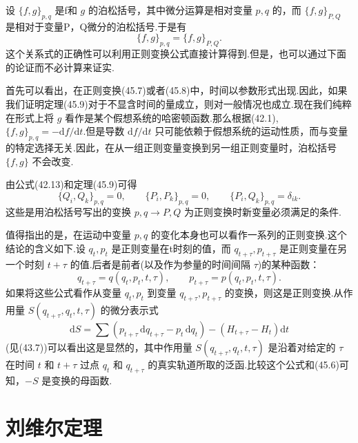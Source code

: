 设 $\{f,g\}_{p,q}$ 是f和 $g$
的泊松括号，其中微分运算是相对变量 $p,q$ 的，而 $\{f,g\}_{P,Q}$
是相对于变量P，Q微分的泊松括号.于是有
\begin{equation}
  \{f,g\}_{p,q}=\{f,g\}_{P,Q}.
\end{equation}
这个关系式的正确性可以利用正则变换公式直接计算得到.但是，也可以通过下面的论证而不必计算来证实.

首先可以看出，在正则变换(45.7)或者(45.8)中，时间以参数形式出现.因此，如果我们证明定理(45.9)对于不显含时间的量成立，则对一般情况也成立.现在我们纯粹在形式上将
$g$ 看作是某个假想系统的哈密顿函数.那么根据(42.1),
$\{f,g\}_{p,q}=-\mathrm{d}f/\mathrm{d}t$.但是导数
$\mathrm{d}f/\mathrm{d}t$
只可能依赖于假想系统的运动性质，而与变量的特定选择无关.因此，在从一组正则变量变换到另一组正则变量时，泊松括号
$\{f,g\}$ 不会改变.

由公式(42.13)和定理(45.9)可得
\begin{equation}
  \{Q_i,Q_k\}_{p,q}=0,\qquad
  \{P_i,P_k\}_{p,q}=0,\qquad
  \{P_i,Q_k\}_{p,q}=\delta_{ik}.
\end{equation}
这些是用泊松括号写出的变换 $p,q\to P,Q$
为正则变换时新变量必须满足的条件.

值得指出的是，在运动中变量 $p,q$
的变化本身也可以看作一系列的正则变换.这个结论的含义如下.设 $q_t,p_t$
是正则变量在t时刻的值，而 $q_{t+\tau},p_{t+\tau}$
是正则变量在另一个时刻 $t+\tau$
的值.后者是前者(以及作为参量的时间间隔 $\tau$)的某种函数：
\begin{equation*}
  q_{t+\tau}=q(q_t,p_t,t,\tau),\qquad
  p_{t+\tau}=p(q_t,p_t,t,\tau).
\end{equation*}
如果将这些公式看作从变量 $q_t,p_t$ 到变量 $q_{t+\tau},p_{t+\tau}$
的变换，则这是正则变换.从作用量 $S(q_{t+\tau},q_t,t,\tau)$ 的微分表示式
\begin{equation*}
  \mathrm{d}S=\sum\left(p_{t+\tau}\,\mathrm{d}q_{t+\tau}
  -p_t\,\mathrm{d}q_t\right)-\left(H_{t+\tau}-H_t\right)\mathrm{d}t
\end{equation*}
(见(43.7))可以看出这是显然的，其中作用量 $S(q_{t+\tau},q_t,t,\tau)$
是沿着对给定的 $\tau$ 在时间 $t$ 和 $t+\tau$ 过点 $q_t$ 和
$q_{t+\tau}$ 的真实轨道所取的泛函.比较这个公式和(45.6)可知，$-S$
是变换的母函数.

\section{刘维尔定理}

